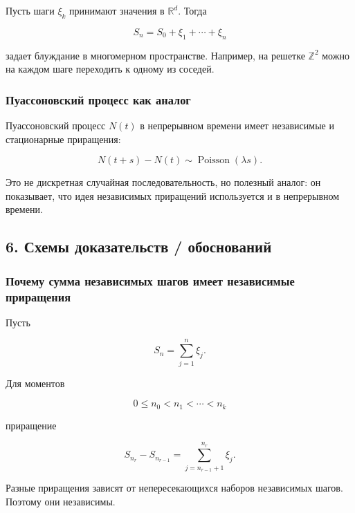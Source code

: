 \documentclass[
  11pt,
  a4paper,
]{article}
\begin{document}
Пусть шаги \(\xi_k\) принимают значения в \(\mathbb R^d\). Тогда

\[
S_n=S_0+\xi_1+\cdots+\xi_n
\]

задает блуждание в многомерном пространстве. Например, на решетке
\(\mathbb Z^2\) можно на каждом шаге переходить к одному из соседей.

\subsubsection{Пуассоновский процесс как
аналог}\label{ux43fux443ux430ux441ux441ux43eux43dux43eux432ux441ux43aux438ux439-ux43fux440ux43eux446ux435ux441ux441-ux43aux430ux43a-ux430ux43dux430ux43bux43eux433}

Пуассоновский процесс \(N(t)\) в непрерывном времени имеет независимые и
стационарные приращения:

\[
N(t+s)-N(t)\sim \operatorname{Poisson}(\lambda s).
\]

Это не дискретная случайная последовательность, но полезный аналог: он
показывает, что идея независимых приращений используется и в непрерывном
времени.

\subsection{6. Схемы доказательств /
обоснований}\label{ux441ux445ux435ux43cux44b-ux434ux43eux43aux430ux437ux430ux442ux435ux43bux44cux441ux442ux432-ux43eux431ux43eux441ux43dux43eux432ux430ux43dux438ux439}

\subsubsection{Почему сумма независимых шагов имеет независимые
приращения}\label{ux43fux43eux447ux435ux43cux443-ux441ux443ux43cux43cux430-ux43dux435ux437ux430ux432ux438ux441ux438ux43cux44bux445-ux448ux430ux433ux43eux432-ux438ux43cux435ux435ux442-ux43dux435ux437ux430ux432ux438ux441ux438ux43cux44bux435-ux43fux440ux438ux440ux430ux449ux435ux43dux438ux44f}

Пусть

\[
S_n=\sum_{j=1}^n\xi_j.
\]

Для моментов

\[
0\le n_0<n_1<\cdots<n_k
\]

приращение

\[
S_{n_r}-S_{n_{r-1}}
=
\sum_{j=n_{r-1}+1}^{n_r}\xi_j.
\]

Разные приращения зависят от непересекающихся наборов независимых шагов.
Поэтому они независимы.
\end{document}
